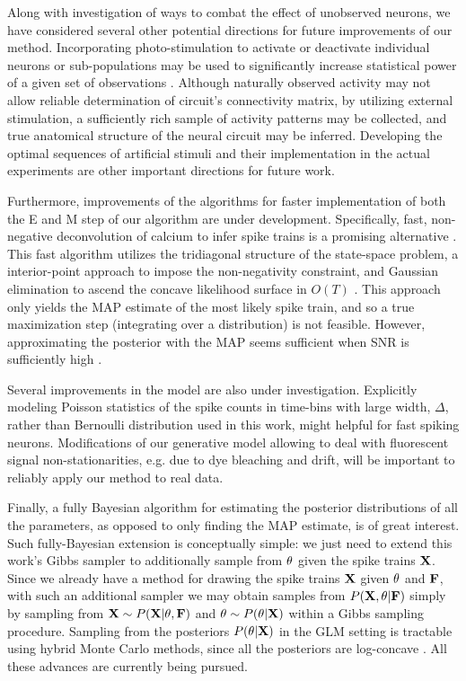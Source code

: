 Along with investigation of ways to combat the effect of unobserved neurons, we have considered several other potential directions for future improvements of our method.  Incorporating photo-stimulation to activate or deactivate individual neurons or sub-populations may be used to significantly increase statistical power of a given set of observations \cite{Deisseroth05,SzobotaIsacoff07}. %
Although naturally observed activity may not allow reliable determination of circuit's connectivity matrix, by utilizing external stimulation, a sufficiently rich sample of activity patterns may be collected, and true anatomical structure of the neural circuit may be inferred. Developing the optimal sequences of artificial stimuli and their implementation in the actual experiments are other important directions for future work.

Furthermore, improvements of the algorithms for faster implementation of both the E and M step of our algorithm are under development.  Specifically, fast, non-negative deconvolution of calcium to infer spike trains is a promising alternative \cite{Vogelstein08}.  This fast algorithm utilizes the tridiagonal structure of the state-space problem, a interior-point approach to impose the non-negativity constraint, and Gaussian elimination to ascend the concave likelihood surface in $O(T)$ \cite{Pan08b}.  This approach only yields the MAP estimate of the most likely spike train, and so a true maximization step (integrating over a distribution) is not feasible.  However, approximating the posterior with the MAP seems sufficient when SNR is sufficiently high \cite{Vogelstein08}.

Several improvements in the model are also under investigation.  Explicitly modeling Poisson statistics of the spike counts in time-bins with large width, $\Delta$, rather than Bernoulli distribution used in this work, might helpful for fast spiking neurons. Modifications of our generative model allowing to deal with fluorescent signal non-stationarities, e.g. due to dye bleaching and drift, will be important to reliably apply our method to real data. 

Finally, a fully Bayesian algorithm for estimating the posterior distributions of all the parameters, as opposed to only finding the MAP estimate, is of great interest. Such fully-Bayesian extension is conceptually simple: we just need to extend this work's Gibbs sampler to additionally sample from $\mathbf{\theta}$ given the spike trains ${\bf X}$. Since we already have a method for drawing the spike trains ${\bf X}$ given $\mathbf{\theta}$ and ${\bf F}$, with such an additional sampler we may obtain samples from $P({\bf X},\mathbf{\theta} | {\bf F})$ simply by sampling from ${\bf X} \sim P({\bf X}|\theta,{\bf F})$ and $\mathbf{\theta} \sim P(\mathbf{\theta} |{\bf X})$ within a Gibbs sampling procedure.  Sampling from the posteriors $P(\mathbf{\theta}|{\bf X})$ in the GLM setting is tractable using hybrid Monte Carlo methods, since all the posteriors are log-concave \cite{Ishwaran99,Gamerman97,Gamerman98,Yashar08}.  All these advances are currently being pursued.